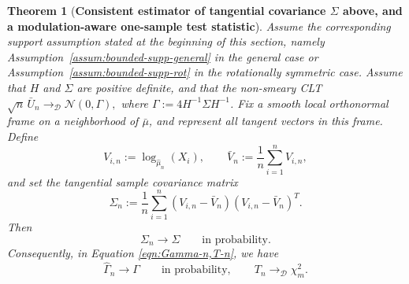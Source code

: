 \documentclass{amsart}
\newtheorem{theorem}{Theorem}[section]
\theoremstyle{definition}
\theoremstyle{remark}
\newcommand\0{\boldsymbol{0}}
\begin{document}
\medskip

\begin{theorem}[\textbf{Consistent estimator of tangential covariance $\Sigma$ above, and a modulation-aware one-sample test statistic}]
\label{thm:mod-aware-test}
Assume the corresponding support assumption stated at the beginning of this section, namely Assumption~\ref{assum:bounded-supp-general} in the general case or Assumption~\ref{assum:bounded-supp-rot} in the rotationally symmetric case.  Assume that \(H\) and \(\Sigma\) are positive definite, and that the non-smeary CLT
\(\sqrt n\,\bar U_n\rightarrow_{\mathcal D}\mathcal N(0,\Gamma),\) where  \(\Gamma:=4H^{-1}\Sigma H^{-1}\). Fix a smooth local orthonormal frame on a neighborhood of $\bar{\mu}$, and represent all tangent vectors in this frame. Define
\[
V_{i,n}:=\log_{\hat{\mu}_n}(X_i),
\qquad
\bar V_n:=\frac1n\sum_{i=1}^n V_{i,n},
\]
and set the tangential sample covariance matrix
\[
\Sigma_n:=\frac1n\sum_{i=1}^n (V_{i,n}-\bar V_n)(V_{i,n}-\bar V_n)^T.
\]
Then
\[
\Sigma_n\to \Sigma
\qquad\text{in probability}.
\]
Consequently, in Equation \eqref{eqn:Gamma-n,T-n},
we have
\[
\widehat\Gamma_n\to \Gamma
\qquad\text{in probability},
\qquad
T_n\rightarrow_{\mathcal D}\chi_m^2.
\]
\end{theorem}
\end{document}
